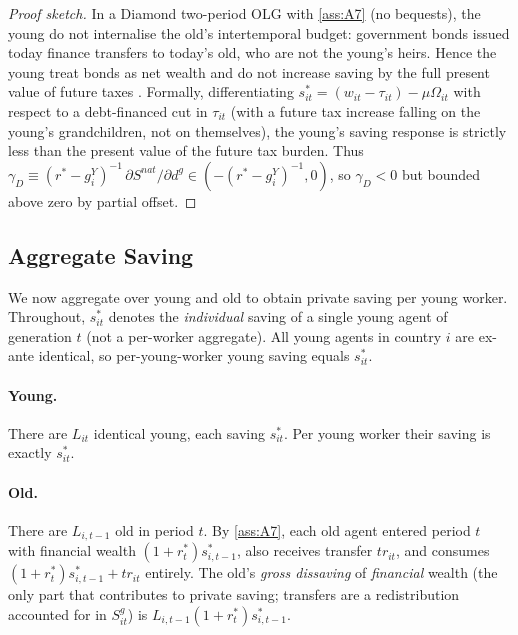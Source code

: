 \begin{proof}[Proof sketch]
In a Diamond two-period OLG with \cref{ass:A7} (no bequests), the young do
not internalise the old's intertemporal budget: government bonds issued today
finance transfers to today's old, who are not the young's heirs. Hence the
young treat bonds as net wealth and do not increase saving by the full present
value of future taxes \citep{Diamond1965,Blanchard1985,Buiter1988}. Formally,
differentiating $s_{it}^*=(w_{it}-\tau_{it})-\mu\Omega_{it}$ with respect to a
debt-financed cut in $\tau_{it}$ (with a future tax increase falling on the
young's grandchildren, not on themselves), the young's saving response is
strictly less than the present value of the future tax burden. Thus
$\gamma_D\equiv (r^*-g_i^Y)^{-1}\,\partial S^{nat}/\partial d^g\in
(-(r^*-g_i^Y)^{-1},0)$, so $\gamma_D<0$ but bounded above zero by partial
offset.
\end{proof}

\subsection{Aggregate Saving}\label{sec:theory:agg-saving}

We now aggregate over young and old to obtain private saving per young worker.
Throughout, $s_{it}^*$ denotes the \emph{individual} saving of a single young
agent of generation $t$ (not a per-worker aggregate). All young agents in
country $i$ are ex-ante identical, so per-young-worker young saving equals
$s_{it}^*$.

\paragraph{Young.} There are $L_{it}$ identical young, each saving $s_{it}^*$.
Per young worker their saving is exactly $s_{it}^*$.

\paragraph{Old.} There are $L_{i,t-1}$ old in period $t$. By \cref{ass:A7},
each old agent entered period $t$ with financial wealth
$(1+r_t^*)s_{i,t-1}^*$, also receives transfer $tr_{it}$, and consumes
$(1+r_t^*)s_{i,t-1}^*+tr_{it}$ entirely. The old's \emph{gross dissaving} of
\emph{financial} wealth (the only part that contributes to private saving;
transfers are a redistribution accounted for in $S_{it}^g$) is
$L_{i,t-1}(1+r_t^*)s_{i,t-1}^*$.

